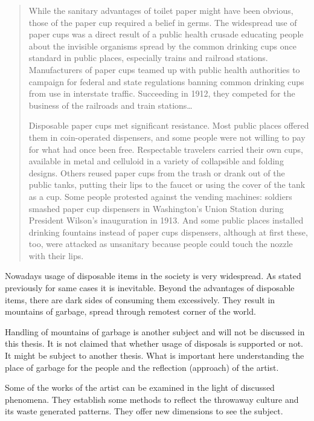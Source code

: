 \begin{quote}
While the sanitary advantages of toilet paper might have been obvious, those of the paper cup required a belief in germs. The widespread use of paper cups was a direct result of a public health crusade educating people about the invisible organisms spread by the common drinking cups once standard in public places, especially trains and railroad stations. Manufacturers of paper cups teamed up with public health authorities to campaign for federal and state regulations banning common drinking cups from use in interstate traffic. Succeeding in 1912, they competed for the business of the railroads and train stations\ldots 

Disposable paper cups met significant resistance. Most public places offered them in coin-operated dispensers, and some people were not willing to pay for what had once been free. Respectable travelers carried their own cups, available in metal and celluloid in a variety of collapsible and folding designs. Others reused paper cups from the trash or drank out of the public tanks, putting their lips to the faucet or using the cover of the tank as a cup. Some people protested against the vending machines: soldiers smashed paper cup dispensers in Washington’s Union Station during President Wilson’s inauguration in 1913. And some public places installed drinking fountains instead of paper cups dispensers, although at first these, too, were attacked as unsanitary because people could touch the nozzle with their lips.
\end{quote}

Nowadays usage of disposable items in the society is very widespread. As stated previously for same cases it is inevitable. Beyond the advantages of disposable items, there are dark sides of consuming them excessively. They result in mountains of garbage, spread through remotest corner of the world.

Handling of mountains of garbage is another subject and will not be discussed in this thesis. It is not claimed that whether usage of disposals is supported or not. It might be subject to another thesis. What is important here understanding the place of garbage for the people and the reflection (approach) of the artist. 



Some of the works of the artist can be examined in the light of discussed phenomena. They establish some methods to reflect the throwaway culture and its waste generated patterns. They offer new dimensions to see the subject.

